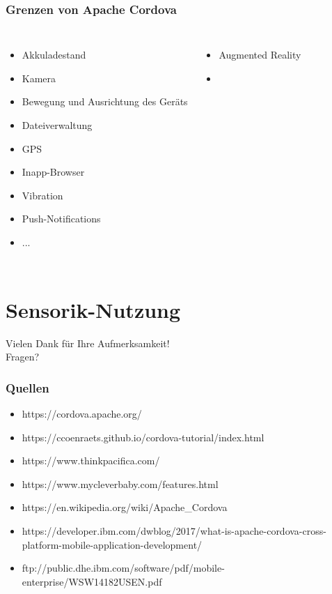 \documentclass[xcolor=dvipsnames]{beamer}
\begin{document}
\begin{frame}\frametitle{Grenzen von Apache Cordova}
	\begin{columns}[t,onlytextwidth]
		\begin{itemize}
			\item Akkuladestand
			\item Kamera
			\item Bewegung und Ausrichtung des Geräts
			\item Dateiverwaltung
			\item GPS
			\item Inapp-Browser
			\item Vibration
			\item Push-Notifications
			\item ...
		\end{itemize}
		\begin{itemize}
			\item Augmented Reality
			\item 
		\end{itemize}
	\end{columns}
\end{frame}

\section{Sensorik-Nutzung}

\begin{frame}
	\centering
	\textcolor{cordovablue}{{\LARGE Vielen Dank für Ihre Aufmerksamkeit!\\[6ex] Fragen?}}
\end{frame}

\begin{frame}\frametitle{Quellen}
\begin{itemize}
	\item https://cordova.apache.org/
	\item https://ccoenraets.github.io/cordova-tutorial/index.html
	\item https://www.thinkpacifica.com/
	\item https://www.mycleverbaby.com/features.html
	\item https://en.wikipedia.org/wiki/Apache\_Cordova
	\item https://developer.ibm.com/dwblog/2017/what-is-apache-cordova-cross-platform-mobile-application-development/
	\item ftp://public.dhe.ibm.com/software/pdf/mobile-enterprise/WSW14182USEN.pdf
\end{itemize}
\end{frame}
\end{document}
